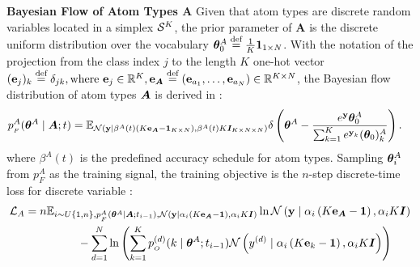 \textbf{Bayesian Flow of Atom Types \texorpdfstring{$\boldsymbol{A}$}{}} 
Given that atom types are discrete random variables located in a simplex $\calS^K$, the prior parameter of $\boldsymbol{A}$ is the discrete uniform distribution over the vocabulary $\parsnt{0}^A \defeq \frac{1}{K}\vec{1}_{1\times N}$. 
With the notation of the projection from the class index $j$ to the length $K$ one-hot vector $ (\oh{j}{K})_k \defeq \delta_{j k}, \text{where }\oh{j}{K}\in \R^{K},\oh{\vA}{KD} \defeq \left(\oh{a_1}{K},\dots,\oh{a_N}{K}\right) \in \R^{K\times N}$, the Bayesian flow distribution of atom types $\vA$ is derived in \citet{bfn}:
\begin{align}
\flow^{A}(\parsn^A \mid \vA; t) &= \E_{\N{\y \mid \beta^A(t)\left(K \oh{\vA}{K\times N} - \vec{1}_{K\times N}\right)}{\beta^A(t) K \vec{I}_{K\times N \times N}}} \delta\left(\parsn^A - \frac{e^{\y}\parsnt{0}^A}{\sum_{k=1}^K e^{\y_k}(\parsnt{0})_{k}^A}\right).
\end{align}
where $\beta^A(t)$ is the predefined accuracy schedule for atom types. Sampling $\btheta_i^A$ from $p_F^A$ as the training signal, the training objective is the $n$-step discrete-time loss for discrete variable \citep{bfn}: 
\begin{align}
&\calL_A = n\E_{i \sim U\{1,n\},\flow^A(\parsn^A \mid \vA ; t_{i-1}),\N{\y \mid \alphat{i}\left(K \oh{\vA}{KD} - \vec{1}\right)}{\alphat{i} K \vec{I}}} \ln \N{\y \mid \alphat{i}\left(K \oh{\vA}{K\times N} - \vec{1}\right)}{\alphat{i} K \vec{I}}\nonumber\\
&\qquad\qquad\qquad-\sum_{d=1}^N \ln \left(\sum_{k=1}^K \out^{(d)}(k \mid \parsn^A; t_{i-1}) \N{\ydd{d} \mid \alphat{i}\left(K\oh{k}{K}- \vec{1}\right)}{\alphat{i} K \vec{I}}\right)\label{discdisc_t_loss_exp}
\end{align}
